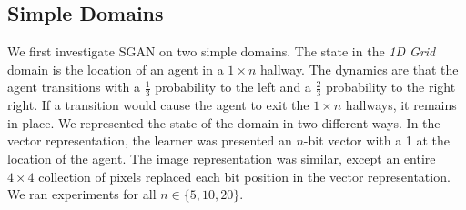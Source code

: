 \documentclass[letterpaper]{article} %
\begin{document}
\subsection{Simple Domains}

\begin{table}\renewcommand{\arraystretch}{1.1}
\centering
{}
\caption{Results on Simple Domains.}
\label{table-simple}
\end{table}
\vspace{-0.2em}

We first investigate SGAN on two simple domains. The state in the \emph{1D Grid} domain is the location of an agent in a $1\times n$ hallway. The dynamics are that the agent transitions with a $\frac{1}{3}$ probability to the left and a $\frac{2}{3}$ probability to the right right. If a transition would cause the agent to exit the $1\times n$ hallways, it remains in place. We represented the state of the domain in two different ways. In the vector representation, the learner was presented an $n$-bit vector with a 1 at the location of the agent. The image representation was similar, except an entire $4\times 4$ collection of pixels replaced each bit position in the vector representation. We ran experiments for all $n \in \{5, 10, 20\}$.
\end{document}
